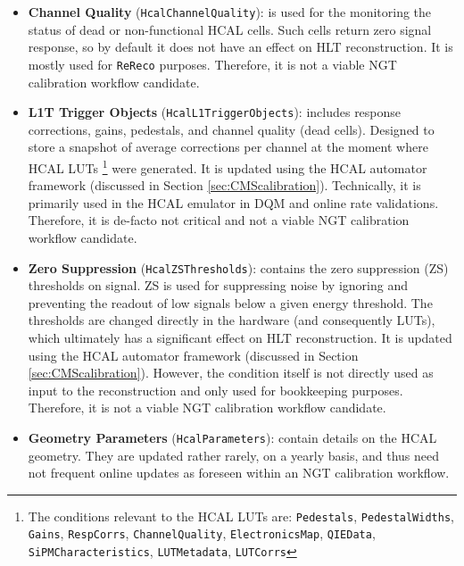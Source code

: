 \begin{itemize}
    \item \textbf{Channel Quality} (\texttt{HcalChannelQuality}): is used for the monitoring the status of dead or non-functional HCAL cells. Such cells return zero signal response, so by default it does not have an effect on HLT reconstruction. It is mostly used for \texttt{ReReco} purposes. Therefore, it is not a viable NGT calibration workflow candidate.
    \item \textbf{L1T Trigger Objects} (\texttt{HcalL1TriggerObjects}): includes response corrections, gains, pedestals, and channel quality (dead cells). Designed to store a snapshot of average corrections per channel at the moment where HCAL LUTs \footnote{The conditions relevant to the HCAL LUTs are: \texttt{Pedestals}, \texttt{PedestalWidths}, \texttt{Gains}, \texttt{RespCorrs}, \texttt{ChannelQuality}, \texttt{ElectronicsMap}, \texttt{QIEData}, \texttt{SiPMCharacteristics}, \texttt{LUTMetadata}, \texttt{LUTCorrs}} were generated. It is updated using the HCAL automator framework (discussed in Section \ref{sec:CMScalibration}). Technically, it is primarily used in the HCAL emulator in DQM and online rate validations. Therefore, it is de-facto not critical and not a viable NGT calibration workflow candidate. %
    \item \textbf{Zero Suppression} (\texttt{HcalZSThresholds}): contains the zero suppression (ZS) thresholds on signal. ZS is used for suppressing noise by ignoring and preventing the readout of low signals below a given energy threshold. The thresholds are changed directly in the hardware (and consequently LUTs), which ultimately has a significant effect on HLT reconstruction. It is updated using the HCAL automator framework (discussed in Section \ref{sec:CMScalibration}). However, the condition itself is not directly used as input to the reconstruction and only used for bookkeeping purposes. Therefore, it is not a viable NGT calibration workflow candidate.
    \item \textbf{Geometry Parameters} (\texttt{HcalParameters}): contain details on the HCAL geometry. They are updated rather rarely, on a yearly basis, and thus need not frequent online updates as foreseen within an NGT calibration workflow.
\end{itemize}

